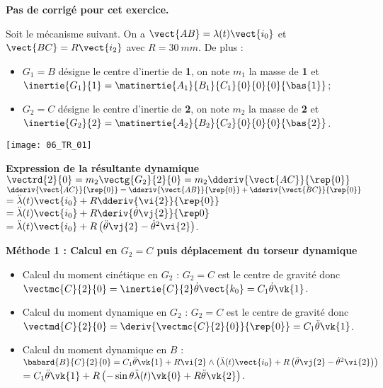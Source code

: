\normaltrue
\correctiontrue


\setcounter{numques}{0}
\ifcorrection
\else
\textbf{Pas de corrigé pour cet exercice.}
\fi

\ifprof
\else
Soit le mécanisme suivant. On a $\vect{AB}=\lambda(t)\vect{i_0}$ et $\vect{BC}=R\vect{i_2}$ avec $R=\SI{30}{mm}$.
De plus :
\begin{itemize}
\item $G_1=B$ désigne le centre d'inertie de \textbf{1}, on note $m_1$ la masse de \textbf{1} et $\inertie{G_1}{1}=\matinertie{A_1}{B_1}{C_1}{0}{0}{0}{\bas{1}}$; 
\item $G_2=C$ désigne le centre d'inertie de \textbf{2}, on note $m_2$ la masse de \textbf{2} et $\inertie{G_2}{2}=\matinertie{A_2}{B_2}{C_2}{0}{0}{0}{\bas{2}}$.
\end{itemize}
\begin{center}
\texttt{[image: 06\_TR\_01]}
\end{center}
\fi

\ifprof

\textbf{Expression de la résultante dynamique}
$\vectrd{2}{0}=m_2\vectg{G_2}{2}{0} = m_2\dderiv{\vect{AC}}{\rep{0}}$
$\dderiv{\vect{AC}}{\rep{0}}= \dderiv{\vect{AB}}{\rep{0}}+\dderiv{\vect{BC}}{\rep{0}}$
$= \ddot{\lambda}(t) \vect{i_0} + R \dderiv{\vi{2}}{\rep{0}}$
$= \ddot{\lambda}(t) \vect{i_0} + R \deriv{\dot{\theta} \vj{2}}{\rep0}$
$= \ddot{\lambda}(t) \vect{i_0} + R \left(\ddot{\theta} \vj{2} - \dot{\theta}^2 \vi{2}\right) $.



\textbf{Méthode 1 : Calcul en $G_2=C$ puis déplacement du torseur dynamique}
\begin{itemize}
\item Calcul du moment cinétique en $G_2$ : $G_2=C$ est le centre de gravité donc $\vectmc{C}{2}{0}=\inertie{C}{2}\dot{\theta}\vect{k_0} = C_1  \dot{\theta} \vk{1}$.
\item Calcul du moment dynamique en $G_2$ : $G_2=C$ est le centre de gravité donc $\vectmd{C}{2}{0}=\deriv{\vectmc{C}{2}{0}}{\rep{0}}= C_1  \ddot{\theta} \vk{1}$.
\item Calcul du moment dynamique en $B$ : $\babard{B}{C}{2}{0} = C_1  \ddot{\theta} \vk{1} + R\vi{2}\wedge\left(  \ddot{\lambda}(t) \vect{i_0} + R \left(\ddot{\theta} \vj{2} - \dot{\theta}^2 \vi{2}\right)\right)$
$= C_1  \ddot{\theta} \vk{1} + R\left( -\sin \theta \ddot{\lambda}(t) \vk{0} + R \ddot{\theta} \vk{2}\right)$.
\end{itemize}

